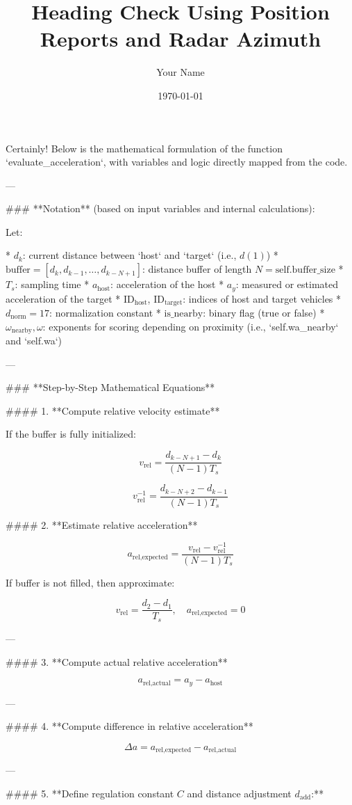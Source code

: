 \documentclass{article}
\title{Heading Check Using Position Reports and Radar Azimuth}
\author{Your Name}
\date{\today}
\begin{document}
Certainly! Below is the mathematical formulation of the function `evaluate_acceleration`, with variables and logic directly mapped from the code.

---

### **Notation** (based on input variables and internal calculations):

Let:

* $d_k$: current distance between `host` and `target` (i.e., $d(1)$)
* $\text{buffer} = [d_k, d_{k-1}, \dots, d_{k-N+1}]$: distance buffer of length $N = \text{self.buffer_size}$
* $T_s$: sampling time
* $a_{\text{host}}$: acceleration of the host
* $a_y$: measured or estimated acceleration of the target
* $\text{ID}_{\text{host}}$, $\text{ID}_{\text{target}}$: indices of host and target vehicles
* $d_{\text{norm}} = 17$: normalization constant
* $\text{is\_nearby}$: binary flag (true or false)
* $\omega_{\text{nearby}}, \omega$: exponents for scoring depending on proximity (i.e., `self.wa_nearby` and `self.wa`)

---

### **Step-by-Step Mathematical Equations**

#### 1. **Compute relative velocity estimate**

If the buffer is fully initialized:

$$
v_{\text{rel}} = \frac{d_{k-N+1} - d_k}{(N - 1) T_s}
$$

$$
v_{\text{rel}}^{-1} = \frac{d_{k-N+2} - d_{k-1}}{(N - 1) T_s}
$$

#### 2. **Estimate relative acceleration**

$$
a_{\text{rel,expected}} = \frac{v_{\text{rel}} - v_{\text{rel}}^{-1}}{(N - 1) T_s}
$$

If buffer is not filled, then approximate:

$$
v_{\text{rel}} = \frac{d_2 - d_1}{T_s}, \quad a_{\text{rel,expected}} = 0
$$

---

#### 3. **Compute actual relative acceleration**

$$
a_{\text{rel,actual}} = a_y - a_{\text{host}}
$$

---

#### 4. **Compute difference in relative acceleration**

$$
\Delta a = a_{\text{rel,expected}} - a_{\text{rel,actual}}
$$

---

#### 5. **Define regulation constant $C$ and distance adjustment $d_{\text{add}}$:**
\end{document}
